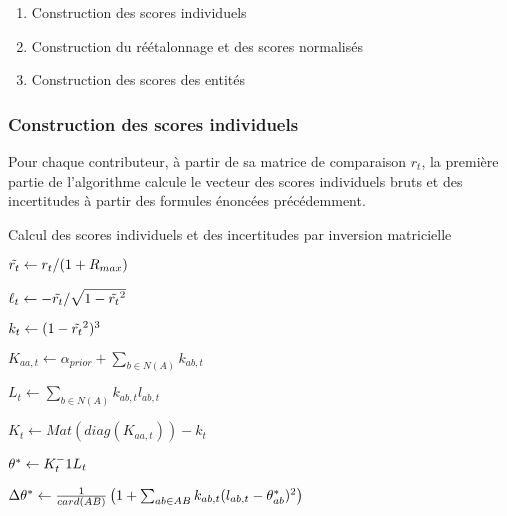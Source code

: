 \begin{enumerate}
    \item Construction des scores individuels
    \item Construction du réétalonnage et des scores normalisés
    \item Construction des scores des entités
\end{enumerate}
\subsubsection{Construction des scores individuels}

Pour chaque contributeur, à partir de sa matrice de comparaison $r_t$, la première partie de l'algorithme calcule le vecteur des scores individuels bruts et des incertitudes à partir des formules énoncées précédemment.

\begin{algorithm}
\renewcommand{\algorithmcfname}{Algorithme}
\caption{Calcul des scores individuels et des incertitudes par inversion matricielle}\label{alg:local_scores_matrix_inversion}

$\Tilde{r_t} \leftarrow r_t/(1+R_{max})$

$\ell_t \leftarrow -\Tilde{r_t}/\sqrt{1-\Tilde{r_t}^2}$

$k_t \leftarrow (1-\Tilde{r_t}^2)^3$

$K_{aa,t} \leftarrow \alpha_{prior} + \sum_{b \in N(A)} k_{ab,t}$

$L_t \leftarrow \sum_{b \in N(A)} k_{ab,t}l_{ab,t}$

$K_t \leftarrow Mat(diag(K_{aa,t})) - k_t $ 

$\theta^* \leftarrow K_t^-1 L_t$

$\Delta\theta^* \leftarrow \frac{1}{card(AB)} \left( 1 + \sum_{ab \in AB} k_{ab,t}(l_{ab,t} - \theta^*_{ab})^2 \right)$

\Return{$\score, \deltascore$}
\end{algorithm}

